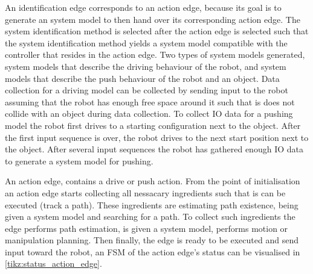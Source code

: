 An identification edge corresponds to an action edge, because its goal is to generate an system model to then hand over its corresponding action edge. The system identification method is selected after the action edge is selected such that the system identification method yields a system model compatible with the controller that resides in the action edge. Two types of system models generated, system models that describe the driving behaviour of the robot, and system models that describe the push behaviour of the robot and an object. Data collection for a driving model can be collected by sending input to the robot assuming that the robot has enough free space around it such that is does not collide with an object during data collection. To collect \ac{IO} data for a pushing model the robot first drives to a starting configuration next to the object. After the first input sequence is over, the robot drives to the next start position next to the object. After several input sequences the robot has gathered enough \ac{IO} data to generate a system model for pushing.\bs

An action edge, contains a drive or push action. From the point of initialisation an action edge starts collecting all nessacary ingredients such that is can be executed (track a path). These ingredients are estimating path existence, being given a system model and searching for a path. To collect such ingredients the edge performs path estimation, is given a system model, performs motion or manipulation planning. Then finally, the edge is ready to be executed and send input toward the robot, an \ac{FSM} of the action edge's status can be visualised in \cref{tikz:status_action_edge}.\bs

